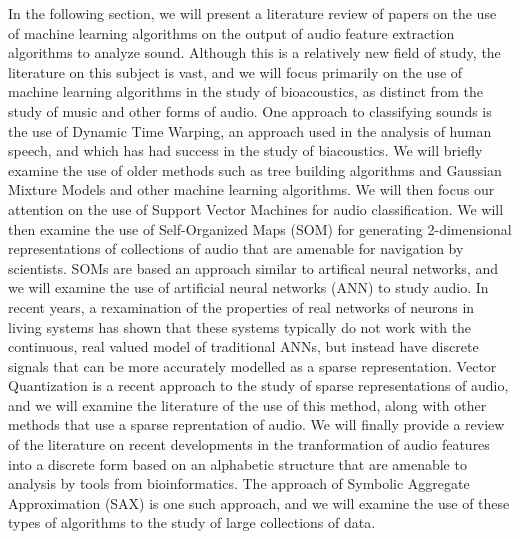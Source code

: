 \documentclass[12pt,oneside]{book}
\begin{document}
In the following section, we will present a literature review of
papers on the use of machine learning algorithms on the output of
audio feature extraction algorithms to analyze sound.  Although this
is a relatively new field of study, the literature on this subject is
vast, and we will focus primarily on the use of machine learning
algorithms in the study of bioacoustics, as distinct from the study of
music and other forms of audio.  One approach to classifying sounds is
the use of Dynamic Time Warping, an approach used in the analysis of
human speech, and which has had success in the study of
biacoustics. We will briefly examine the use of older methods such as
tree building algorithms and Gaussian Mixture Models and other machine
learning algorithms.  We will then focus our attention on the use of
Support Vector Machines for audio classification.  We will then
examine the use of Self-Organized Maps (SOM) for generating
2-dimensional representations of collections of audio that are
amenable for navigation by scientists.  SOMs are based an approach
similar to artifical neural networks, and we will examine the use of
artificial neural networks (ANN) to study audio.  In recent years, a
rexamination of the properties of real networks of neurons in living
systems has shown that these systems typically do not work with the
continuous, real valued model of traditional ANNs, but instead have
discrete signals that can be more accurately modelled as a sparse
representation.  Vector Quantization is a recent approach to the study
of sparse representations of audio, and we will examine the literature
of the use of this method, along with other methods that use a sparse
reprentation of audio.  We will finally provide a review of the
literature on recent developments in the tranformation of audio
features into a discrete form based on an alphabetic structure that
are amenable to analysis by tools from bioinformatics.  The approach
of Symbolic Aggregate Approximation (SAX) is one such approach, and we
will examine the use of these types of algorithms to the study of
large collections of data.
\end{document}
